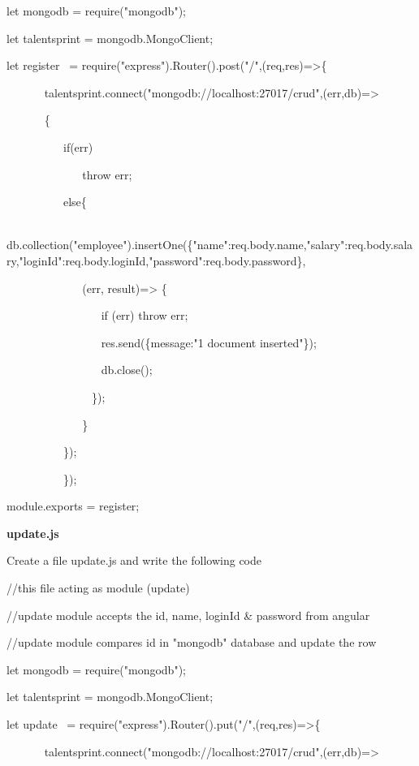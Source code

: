 \documentclass[
]{article}
\begin{document}
let mongodb = require("mongodb");

let talentsprint = mongodb.MongoClient;

\hfill    

let register{~ }=
require("express").Router().post("/",(req,res)=\textgreater\{

{~ ~ ~ ~
}talentsprint.connect("mongodb://localhost:27017/crud",(err,db)=\textgreater{}

{~ ~ ~ ~ }\{

{~ ~ ~ ~ ~ ~ }if(err)

{~ ~ ~ ~ ~ ~ ~ ~ }throw err;

{~ ~ ~ ~ ~ ~ }else\{

{~ ~ ~ ~ ~ ~ ~ ~
}db.collection("employee").insertOne(\{"name":req.body.name,"salary":req.body.salary,"loginId":req.body.loginId,"password":req.body.password\},

{~ ~ ~ ~ ~ ~ ~ ~ }(err, result)=\textgreater{} \{

{~ ~ ~ ~ ~ ~ ~ ~ ~ ~ }if (err) throw err;

{~ ~ ~ ~ ~ ~ ~ ~ ~ ~ }res.send(\{message:"1 document inserted"\});

{~ ~ ~ ~ ~ ~ ~ ~ ~ ~ }db.close();

{~ ~ ~ ~ ~ ~ ~ ~ ~ }\});

{~ ~ ~ ~ ~ ~ ~ ~ }\}

{~ ~ ~ ~ ~ ~ }\});

{~ ~ ~ ~ ~ ~ }\});

module.exports = register;


\hfill    

\newpage
{\textbf{update.js}}

Create a file update.js and write the following code

//this file acting as module (update)

//update module accepts the id, name, loginId \& password from angular

//update module compares id in "mongodb" database and update the row

\hfill    

let mongodb = require("mongodb");

let talentsprint = mongodb.MongoClient;

\hfill    

let update{~ }=
require("express").Router().put("/",(req,res)=\textgreater\{

{~ ~ ~ ~
}talentsprint.connect("mongodb://localhost:27017/crud",(err,db)=\textgreater{}
\end{document}
